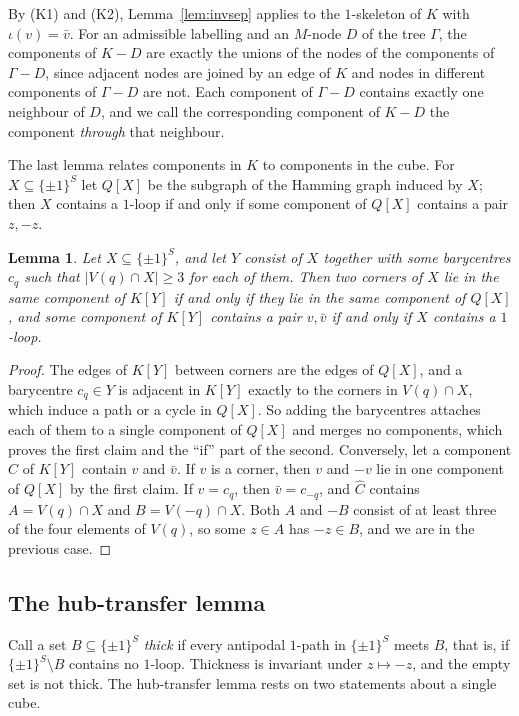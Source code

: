 \documentclass[11pt,letterpaper]{article}
\newtheorem{lemma}[theorem]{Lemma}
\theoremstyle{definition}
\newcommand{\cube}[1]{\{\pm1\}^{#1}}
\begin{document}
By (K1) and (K2), Lemma~\ref{lem:invsep} applies to the $1$-skeleton of $K$ with $\iota(v)=\bar v$.
For an admissible labelling and an $M$-node $D$ of the tree $\Gamma$, the components of $K-D$ are
exactly the unions of the nodes of the components of $\Gamma-D$, since adjacent nodes are joined by an
edge of $K$ and nodes in different components of $\Gamma-D$ are not. Each component of $\Gamma-D$
contains exactly one neighbour of $D$, and we call the corresponding component of $K-D$ the component
\emph{through} that neighbour.

The last lemma relates components in $K$ to components in the cube. For $X\subseteq\cube S$ let
$Q[X]$ be the subgraph of the Hamming graph induced by $X$; then $X$ contains a $1$-loop if and only
if some component of $Q[X]$ contains a pair $z,-z$.

\begin{lemma}\label{lem:corners}
Let $X\subseteq\cube S$, and let $Y$ consist of $X$ together with some barycentres $c_q$ such that
$|V(q)\cap X|\ge3$ for each of them. Then two corners of $X$ lie in the same component of $K[Y]$ if
and only if they lie in the same component of $Q[X]$, and some component of $K[Y]$ contains a pair
$v,\bar v$ if and only if $X$ contains a $1$-loop.
\end{lemma}

\begin{proof}
The edges of $K[Y]$ between corners are the edges of $Q[X]$, and a barycentre $c_q\in Y$ is adjacent
in $K[Y]$ exactly to the corners in $V(q)\cap X$, which induce a path or a cycle in $Q[X]$. So adding
the barycentres attaches each of them to a single component of $Q[X]$ and merges no components, which
proves the first claim and the ``if'' part of the second. Conversely, let a component $\hat C$ of
$K[Y]$ contain $v$ and $\bar v$. If $v$ is a corner, then $v$ and $-v$ lie in one component of $Q[X]$
by the first claim. If $v=c_q$, then $\bar v=c_{-q}$, and $\hat C$ contains $A=V(q)\cap X$ and
$B=V(-q)\cap X$. Both $A$ and $-B$ consist of at least three of the four elements of $V(q)$, so some
$z\in A$ has $-z\in B$, and we are in the previous case.
\end{proof}

\subsection{The hub-transfer lemma}

Call a set $B\subseteq\cube S$ \emph{thick} if every antipodal $1$-path in $\cube S$ meets $B$, that
is, if $\cube S\setminus B$ contains no $1$-loop. Thickness is invariant under $z\mapsto-z$, and the
empty set is not thick. The hub-transfer lemma rests on two statements about a single cube.
\end{document}
